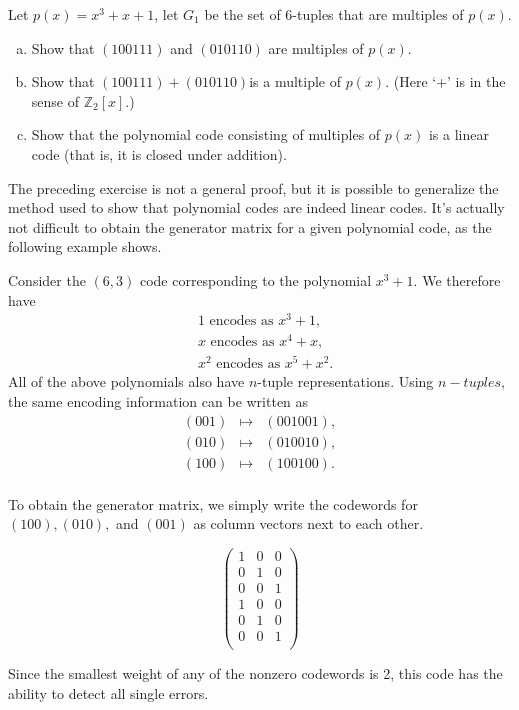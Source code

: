 \begin{exercise}
Let $p(x) = x^3 + x + 1$, let $G_1$ be the set of 6-tuples that are multiples of $p(x)$.
\begin{enumerate}[(a)]
\item
Show that $(100111)$ and $(010110)$ are multiples of 
$p(x)$.
\item
Show that $(100111)+(010110)$is a multiple of $p(x)$. (Here `+' is in the sense of $\mathbb{Z}_2[x]$.)
\item
Show that the polynomial code consisting of multiples of $p(x)$ is a linear code (that is, it is closed under addition).
\end{enumerate}
\end{exercise}

The preceding exercise is not a general proof, but it is possible to generalize the method used to show that polynomial codes are indeed linear codes. It's actually not difficult to obtain the generator matrix for a given polynomial code, as the following example shows.

\begin{example}
Consider the $(6,3)$ code corresponding to the polynomial $x^3+1$.  We therefore have
\begin{align*}
&1 \text{ encodes as }x^3+1,\\
&x \text{ encodes as }x^4+x,\\
&x^2 \text{ encodes as }x^5+x^2.
\end{align*}
All of the above polynomials also have $n$-tuple representations.  Using $n-tuples$, the same encoding information can be written as
\[
\begin{array}{rcl}
(001) & \mapsto & (001001),  \\
(010) & \mapsto & (010010) , \\
(100) & \mapsto & (100100). \\
\end{array}
\]

To obtain the generator matrix, we simply write the codewords for $(100), (010),$ and $(001)$ as column vectors next to each other.

\[\begin{pmatrix} 
1 & 0 & 0\\
0 & 1 & 0\\
0 & 0 & 1\\
1 & 0 & 0\\
0 & 1 & 0\\
0 & 0 & 1\\
\end{pmatrix}\]

Since the smallest weight of any of the nonzero codewords is 2, this code has the ability to detect all single errors.  

\end{example}

